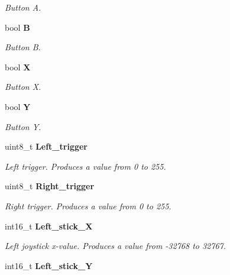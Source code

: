\begin{DoxyCompactItemize}
\begin{DoxyCompactList}\small\item\em Button A. \end{DoxyCompactList}\item 
bool {\bf B}\label{structbutton_a0152c46354bddcc592bce01be84d9dfd}

\begin{DoxyCompactList}\small\item\em Button B. \end{DoxyCompactList}\item 
bool {\bf X}\label{structbutton_aab1bde286e010d81472b269b419806d6}

\begin{DoxyCompactList}\small\item\em Button X. \end{DoxyCompactList}\item 
bool {\bf Y}\label{structbutton_a1d79ec66791bea4323f4f857c48c2975}

\begin{DoxyCompactList}\small\item\em Button Y. \end{DoxyCompactList}\item 
uint8\-\_\-t {\bf Left\-\_\-trigger}\label{structbutton_aab887f94fef5bd12e3d14838a15c7a10}

\begin{DoxyCompactList}\small\item\em Left trigger. Produces a value from 0 to 255. \end{DoxyCompactList}\item 
uint8\-\_\-t {\bf Right\-\_\-trigger}\label{structbutton_a79bedbdbd5a48a621f7a6d8a06b82bf8}

\begin{DoxyCompactList}\small\item\em Right trigger. Produces a value from 0 to 255. \end{DoxyCompactList}\item 
int16\-\_\-t {\bf Left\-\_\-stick\-\_\-\-X}\label{structbutton_a301836b32a4bd9f8e4269df153eb55d7}

\begin{DoxyCompactList}\small\item\em Left joystick x-\/value. Produces a value from -\/32768 to 32767. \end{DoxyCompactList}\item 
int16\-\_\-t {\bf Left\-\_\-stick\-\_\-\-Y}\label{structbutton_a3fa918572febd2d9e75dbef1929cfe23}


\end{DoxyCompactItemize}
